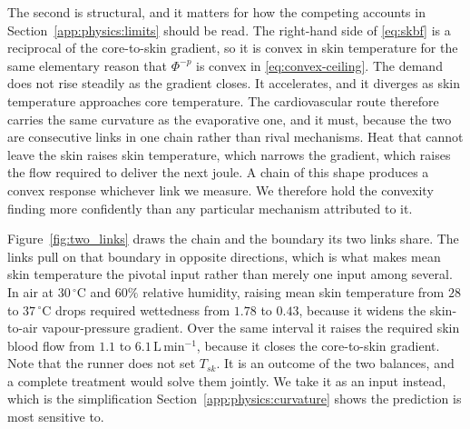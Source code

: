 The second is structural, and it matters for how the competing accounts in
Section~\ref{app:physics:limits} should be read. The right-hand side of
\eqref{eq:skbf} is a reciprocal of the core-to-skin gradient, so it is convex in
skin temperature for the same elementary reason that $\Phi^{-p}$ is convex in
\eqref{eq:convex-ceiling}. The demand does not rise steadily as the gradient
closes. It accelerates, and it diverges as skin temperature approaches core
temperature. The cardiovascular route therefore carries the same curvature as
the evaporative one, and it must, because the two are consecutive links in one
chain rather than rival mechanisms. Heat that cannot leave the skin raises skin
temperature, which narrows the gradient, which raises the flow required to
deliver the next joule. A chain of this shape produces a convex response
whichever link we measure. We therefore hold the convexity finding more
confidently than any particular mechanism attributed to it.

Figure~\ref{fig:two_links} draws the chain and the boundary its two links share.
The links pull on that boundary in opposite directions, which is what makes mean
skin temperature the pivotal input rather than merely one input among several.
In air at $30\,^{\circ}$C and $60\%$ relative humidity, raising mean skin
temperature from $28$ to $37\,^{\circ}$C drops required wettedness from $1.78$
to $0.43$, because it widens the skin-to-air vapour-pressure gradient. Over the
same interval it raises the required skin blood flow from $1.1$ to
$6.1\,\mathrm{L\,min^{-1}}$, because it closes the core-to-skin gradient. Note
that the runner does not set $T_{sk}$. It is an outcome of the two balances, and
a complete treatment would solve them jointly. We take it as an input instead,
which is the simplification Section~\ref{app:physics:curvature} shows the
prediction is most sensitive to.

